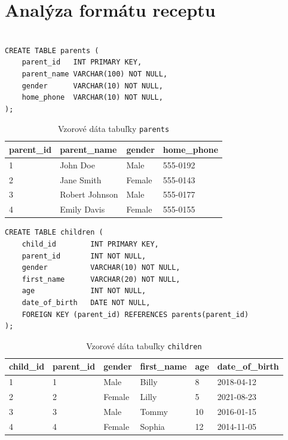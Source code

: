 \newpage
\section{Analýza formátu receptu}

\begin{lstlisting}[caption={Štruktúra ukážkovej databázy.}]

CREATE TABLE parents (
    parent_id   INT PRIMARY KEY,
    parent_name VARCHAR(100) NOT NULL,
    gender      VARCHAR(10) NOT NULL,
    home_phone  VARCHAR(10) NOT NULL,
);
\end{lstlisting}


\begin{table}[ht]
    \centering
    \begin{tabular}{|l|l|l|l|}
         \toprule
         \textbf{parent\_id} & \textbf{parent\_name} & \textbf{gender} & \textbf{home\_phone} \\
         \midrule
         1 & John Doe       & Male   & 555-0192 \\
         2 & Jane Smith     & Female & 555-0143 \\
         3 & Robert Johnson & Male   & 555-0177 \\
         4 & Emily Davis    & Female & 555-0155 \\
         \bottomrule
    \end{tabular}
    \caption{Vzorové dáta tabuľky \texttt{parents}}
    \label{tab:sample-parents}
\end{table}

\begin{lstlisting}[caption={Štruktúra ukážkovej databázy.}]
CREATE TABLE children (
    child_id        INT PRIMARY KEY,
    parent_id       INT NOT NULL,
    gender          VARCHAR(10) NOT NULL,
    first_name      VARCHAR(20) NOT NULL,
    age             INT NOT NULL,
    date_of_birth   DATE NOT NULL,
    FOREIGN KEY (parent_id) REFERENCES parents(parent_id)
);
\end{lstlisting}


\begin{table}[ht]
    \centering
    \begin{tabular}{|l|l|l|l|l|l|}
         \toprule
         \textbf{child\_id} & \textbf{parent\_id} & \textbf{gender} & \textbf{first\_name} & \textbf{age} & \textbf{date\_of\_birth} \\
         \midrule
         1 & 1 & Male   & Billy  & 8    & 2018-04-12 \\
         2 & 2 & Female & Lilly  & 5    & 2021-08-23 \\
         3 & 3 & Male   & Tommy  & 10   & 2016-01-15 \\
         4 & 4 & Female & Sophia & 12   & 2014-11-05 \\
         \bottomrule
    \end{tabular}
    \caption{Vzorové dáta tabuľky \texttt{children}}
    \label{tab:sample_children}
\end{table}

